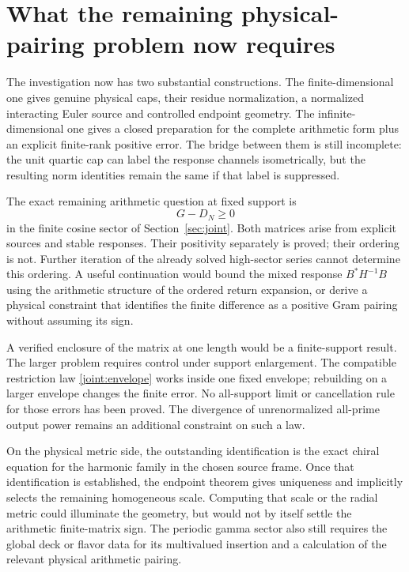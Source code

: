 \section{What the remaining physical-pairing problem now requires}
\label{sec:outlook}
The investigation now has two substantial constructions. The
finite-dimensional one gives genuine physical caps, their
residue normalization, a normalized interacting Euler source and
controlled endpoint geometry. The infinite-dimensional one gives
a closed preparation for the complete arithmetic form plus an
explicit finite-rank positive error. The bridge between them is
still incomplete: the unit quartic cap can label the response
channels isometrically, but the resulting norm identities remain
the same if that label is suppressed.

The exact remaining arithmetic question at fixed support is
\[
G-D_N\ge0
\]
in the finite cosine sector of Section~\ref{sec:joint}.
Both matrices arise from explicit sources and stable responses.
Their positivity separately is proved; their ordering is not.
Further iteration of the already solved high-sector series
cannot determine this ordering. A useful continuation would
bound the mixed response $B^*H^{-1}B$ using the arithmetic
structure of the ordered return expansion, or derive a physical
constraint that identifies the finite difference as a positive
Gram pairing without assuming its sign.

A verified enclosure of the matrix at one length would be a
finite-support result. The larger problem requires control under
support enlargement. The compatible restriction law
\eqref{joint:envelope} works inside one fixed envelope; rebuilding
on a larger envelope changes the finite error. No all-support
limit or cancellation rule for those errors has been proved.
The divergence of unrenormalized all-prime output power remains
an additional constraint on such a law.

On the physical metric side, the outstanding identification is
the exact chiral equation for the harmonic family in the chosen
source frame. Once that identification is established, the
endpoint theorem gives uniqueness and implicitly selects the
remaining homogeneous scale. Computing that scale or the
radial metric could illuminate the geometry, but would not by
itself settle the arithmetic finite-matrix sign. The periodic
gamma sector also still requires the global deck or flavor data
for its multivalued insertion and a calculation of the relevant
physical arithmetic pairing.

